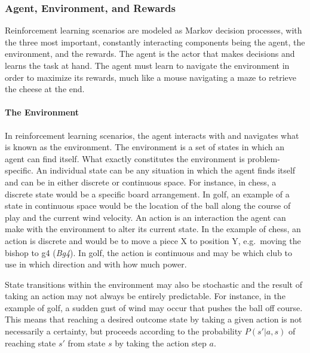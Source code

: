 \subsubsection*{Agent, Environment, and Rewards}


Reinforcement learning scenarios are modeled as Markov decision processes,
with
the three most important, constantly interacting components
being
the agent, the environment, and the rewards.
%
The agent is the actor that makes decisions and learns the task at hand.
%
The agent must learn to navigate the environment in order to maximize its
rewards,
much like a mouse navigating a maze to retrieve the cheese at the end.

\paragraph*{The Environment}

In reinforcement learning scenarios,
the agent interacts with and navigates what is known as the environment.
%
The environment is a set of states in which an agent can find itself.
%
What exactly constitutes the environment is problem-specific.
%
An individual state can be any situation in which the agent finds itself
and can be in either discrete or continuous space.
%
For instance, in chess, a discrete state would be a specific board arrangement.
%
In golf, an example of a state in continuous space would be 
the location of the ball along the course of play
and the current wind velocity.
%
An action is an interaction the agent can make with the environment to alter
its current state.
%
In the example of chess,
an action is discrete and would be to move a piece X to position Y,
e.g.\  moving the bishop to g4 (\textit{Bg4}).
%
In golf, the action is continuous and may be
which club to use in which direction and with how much power.

State transitions within the environment may also be stochastic
and
the result of taking an action may not always be entirely predictable.
%
For instance,
in the example of golf,
a sudden gust of wind may occur that pushes the ball off course.
%
This means that reaching a desired outcome state by
taking a given action is not necessarily a certainty,
but proceeds according to the probability
$P(s'|a,s)$
of reaching state $s'$ from state $s$ by taking the action step $a$.

